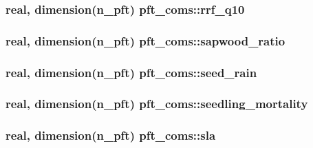 \subsubsection[{\texorpdfstring{rrf\+\_\+q10}{rrf_q10}}]{\setlength{\rightskip}{0pt plus 5cm}real, dimension(n\+\_\+pft) pft\+\_\+coms\+::rrf\+\_\+q10}\hypertarget{namespacepft__coms_aadcb3d9b31b09de0ee92c5c0d549ce28}{}\label{namespacepft__coms_aadcb3d9b31b09de0ee92c5c0d549ce28}
\subsubsection[{\texorpdfstring{sapwood\+\_\+ratio}{sapwood_ratio}}]{\setlength{\rightskip}{0pt plus 5cm}real, dimension(n\+\_\+pft) pft\+\_\+coms\+::sapwood\+\_\+ratio}\hypertarget{namespacepft__coms_ad00617b976d68174e6d5fb6227be9d90}{}\label{namespacepft__coms_ad00617b976d68174e6d5fb6227be9d90}
\subsubsection[{\texorpdfstring{seed\+\_\+rain}{seed_rain}}]{\setlength{\rightskip}{0pt plus 5cm}real, dimension(n\+\_\+pft) pft\+\_\+coms\+::seed\+\_\+rain}\hypertarget{namespacepft__coms_a9e5f0badf00a834a699115fc8974d9f2}{}\label{namespacepft__coms_a9e5f0badf00a834a699115fc8974d9f2}
\subsubsection[{\texorpdfstring{seedling\+\_\+mortality}{seedling_mortality}}]{\setlength{\rightskip}{0pt plus 5cm}real, dimension(n\+\_\+pft) pft\+\_\+coms\+::seedling\+\_\+mortality}\hypertarget{namespacepft__coms_a0fe258b3674104f09d7226f87f39fc0b}{}\label{namespacepft__coms_a0fe258b3674104f09d7226f87f39fc0b}
\subsubsection[{\texorpdfstring{sla}{sla}}]{\setlength{\rightskip}{0pt plus 5cm}real, dimension(n\+\_\+pft) pft\+\_\+coms\+::sla}\hypertarget{namespacepft__coms_ad1aabb01620d2b7320709e93cfe784f8}{}\label{namespacepft__coms_ad1aabb01620d2b7320709e93cfe784f8}

